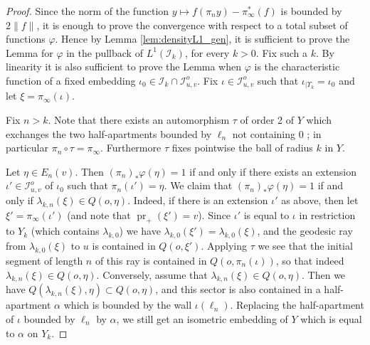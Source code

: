 \documentclass[a4paper, 11pt]{article}
\theoremstyle{plain}
\theoremstyle{definition}
\theoremstyle{remark}
\DeclareMathOperator{\Res}{Res}
\DeclareMathOperator{\Isom}{Isom}
\DeclareMathOperator{\pr}{pr}
\newcommand{\IR}{\mathcal I}
\begin{document}
\begin{proof}

    Since the norm of the function $y \mapsto f(\pi_n y) -
\pi_\infty^* (f)$ is bounded by $2\|f\|$, it is enough to prove the convergence with respect to a total subset of functions $\varphi$. Hence by Lemma \ref{lem:densityL1_gen}, it is sufficient to prove the Lemma for $\varphi$ in the pullback of $L^1(\IR_k)$, for every $k>0$. Fix such a $k$. By linearity it is also sufficient to prove the Lemma when $\varphi$ is the characteristic function of a fixed embedding $\iota_0\in \IR_k\cap \IR_{u,v}^o$. Fix $\iota\in \IR_{u,v}^o$ such that $\iota_{|\Upsilon_k}=\iota_0$ and let $\xi=\pi_\infty(\iota)$.

     Fix $n>k$.  Note that there exists an automorphism $\tau$ of order 2 of $Y$ which exchanges the two half-apartments bounded by $\ell_n$ not containing $0$ ; in particular $\pi_n\circ \tau=\pi_\infty$. Furthermore $\tau$ fixes pointwise the ball of radius $k$ in $Y$.

     Let $\eta\in E_n(v)$. Then $(\pi_n)_*\varphi(\eta)=1$ if and only if there exists an extension $\iota'\in \IR_{u,v}^o$ of $\iota_0$ such that $\pi_n(\iota')=\eta$. We claim that $(\pi_n)_*\varphi(\eta)=1$ if and only if $\lambda_{k,n}(\xi)\in Q(o,\eta)$. Indeed, if there is an extension $\iota'$ as above, then let $\xi'=\pi_\infty(\iota')$ (and note that $\pr_+(\xi')=v$). Since $\iota'$ is equal to $\iota$ in restriction to $Y_k$ (which contains $\lambda_{k,0}$) we have $\lambda_{k,0}(\xi')=\lambda_{k,0}(\xi)$, and the geodesic ray from $\lambda_{k,0}(\xi)$ to $u$ is contained in $Q(o,\xi')$. Applying $\tau$ we see that the initial segment of length $n$ of this ray is contained in $Q(o,\pi_n(\iota))$, so that indeed $\lambda_{k,n}(\xi)\in Q(o,\eta)$. Conversely, assume that $\lambda_{k,n}(\xi)\in Q(o,\eta)$. Then we have $Q(\lambda_{k,n}(\xi),\eta)\subset Q(o,\eta)$, and this sector is also contained in a half-apartment $\alpha$ which is bounded by the wall $\iota(\ell_n)$. Replacing the half-apartment of $\iota$ bounded by $\ell_n$ by $\alpha$, we still get an isometric embedding of $Y$ which is equal to $\alpha$ on $Y_k$.



\end{proof}
\end{document}
